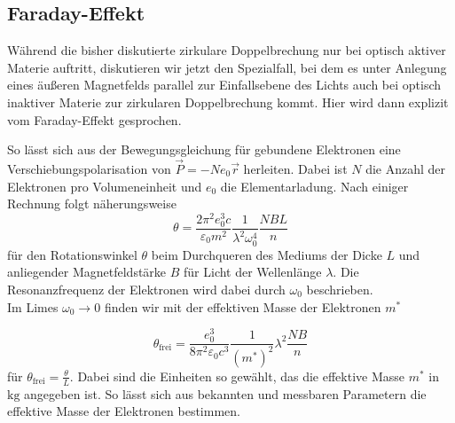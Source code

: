 \subsection{Faraday-Effekt}

Während die bisher diskutierte zirkulare Doppelbrechung nur bei optisch aktiver Materie auftritt, diskutieren wir jetzt den Spezialfall, 
bei dem es unter Anlegung eines äußeren Magnetfelds parallel zur Einfallsebene des Lichts auch bei optisch inaktiver Materie zur zirkularen Doppelbrechung kommt.
Hier wird dann explizit vom Faraday-Effekt gesprochen.

So lässt sich aus der Bewegungsgleichung für gebundene Elektronen eine Verschiebungspolarisation von $\vec{P} = - N e_0 \vec{r}$ herleiten.
Dabei ist $N$ die Anzahl der Elektronen pro Volumeneinheit und $e_0$ die Elementarladung.
Nach einiger Rechnung folgt näherungsweise
\begin{equation*}
    \theta = \frac{2 \pi^2 e^3_0 c}{\varepsilon_0 m^2} \frac{1}{ \lambda^2 \omega_0^4} \frac{N B L}{n}
\end{equation*}
für den Rotationswinkel $\theta$ beim Durchqueren des Mediums der Dicke $L$ und anliegender Magnetfeldstärke $B$ für Licht der Wellenlänge $\lambda$.
Die Resonanzfrequenz der Elektronen wird dabei durch $\omega_0$ beschrieben. \\

Im Limes $\omega_0 \rightarrow 0$ finden wir mit der effektiven Masse der Elektronen $m^*$

\begin{equation}
    \theta_\text{frei} = \frac{e^3_0}{8 \pi^2 \varepsilon_0 c^3} \frac{1}{(m^*)^2} \lambda^2 \frac{N B}{n}
    \label{eq:theta_frei}
\end{equation}
für $\theta_\text{frei} = \frac{\theta}{L}$.
Dabei sind die Einheiten so gewählt, das die effektive Masse $m^*$ in $\si{\kilo\gram}$ angegeben ist.
So lässt sich aus bekannten und messbaren Parametern die effektive Masse der Elektronen bestimmen.


